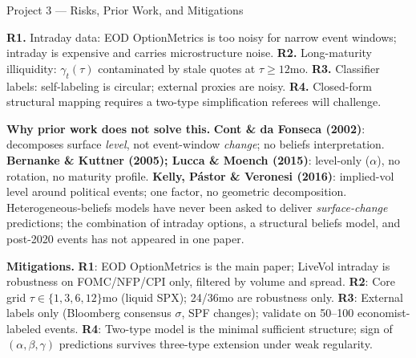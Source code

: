 \documentclass[aspectratio=169, 11pt]{beamer}
\newcommand{\riskbox}[1]{%
  \begin{tcolorbox}[colback=accentred!8,colframe=accentred,boxrule=0.8pt,arc=2pt,left=4pt,right=4pt,top=2pt,bottom=2pt]
    #1\end{tcolorbox}}
\newcommand{\fixbox}[1]{%
  \begin{tcolorbox}[colback=accentblue!8,colframe=accentblue,boxrule=0.8pt,arc=2pt,left=4pt,right=4pt,top=2pt,bottom=2pt]
    #1\end{tcolorbox}}
\begin{document}
\begin{frame}{Project 3 --- Risks, Prior Work, and Mitigations}
\footnotesize

\riskbox{\textbf{R1.} Intraday data: EOD OptionMetrics is too noisy for narrow event windows; intraday is expensive and carries microstructure noise.
\quad\textbf{R2.} Long-maturity illiquidity: $\gamma_t(\tau)$ contaminated by stale quotes at $\tau\!\geq\!12$mo.
\quad\textbf{R3.} Classifier labels: self-labeling is circular; external proxies are noisy.
\quad\textbf{R4.} Closed-form structural mapping requires a two-type simplification referees will challenge.}

\vspace{0.1cm}
\textbf{Why prior work does not solve this.}
\textbf{Cont \& da Fonseca (2002)}: decomposes surface \emph{level}, not event-window \emph{change}; no beliefs interpretation.
\textbf{Bernanke \& Kuttner (2005); Lucca \& Moench (2015)}: level-only ($\alpha$), no rotation, no maturity profile.
\textbf{Kelly, P\'astor \& Veronesi (2016)}: implied-vol level around political events; one factor, no geometric decomposition.
Heterogeneous-beliefs models have never been asked to deliver \emph{surface-change} predictions; the combination of intraday options, a structural beliefs model, and post-2020 events has not appeared in one paper.

\vspace{0.1cm}
\fixbox{\textbf{Mitigations.}
\textbf{R1}: EOD OptionMetrics is the main paper; LiveVol intraday is robustness on FOMC/NFP/CPI only, filtered by volume and spread.
\textbf{R2}: Core grid $\tau\!\in\!\{1,3,6,12\}$mo (liquid SPX); 24/36mo are robustness only.
\textbf{R3}: External labels only (Bloomberg consensus $\sigma$, SPF changes); validate on 50--100 economist-labeled events.
\textbf{R4}: Two-type model is the minimal sufficient structure; sign of $(\alpha,\beta,\gamma)$ predictions survives three-type extension under weak regularity.}

\end{frame}
\end{document}
